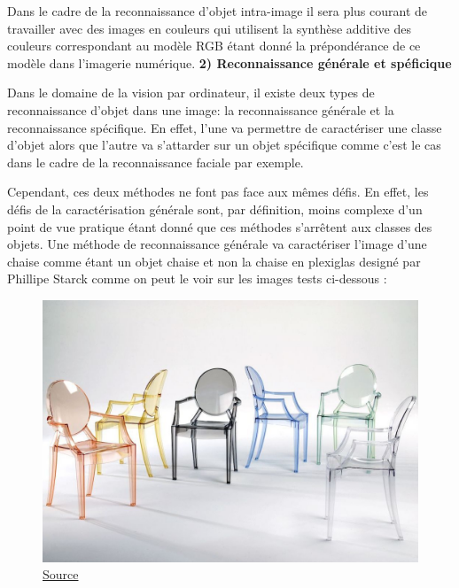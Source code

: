 \documentclass[a4paper,12pt]{article} %
\begin{document}
\par
Dans le cadre de la reconnaissance d’objet intra-image il sera plus courant de travailler avec des images en couleurs qui utilisent la synthèse additive des couleurs correspondant au modèle RGB étant donné la prépondérance de ce modèle dans l’imagerie numérique.\newline
\newpage
\textbf{2) Reconnaissance générale et spéficique}
\newline
\par
	Dans le domaine de la vision par ordinateur, il existe deux types de reconnaissance d'objet dans une image: la reconnaissance générale et la reconnaissance spécifique. En effet, l’une va permettre de caractériser une classe d’objet alors que l’autre va s’attarder sur un objet spécifique comme c’est le cas dans le cadre de la reconnaissance faciale par exemple. 
\newline
\par
Cependant, ces deux méthodes ne font pas face aux mêmes défis. En effet, les défis de la caractérisation générale sont, par définition, moins complexe d’un point de vue pratique étant donné que ces méthodes s’arrêtent aux classes des objets. Une méthode de reconnaissance générale va caractériser l’image d’une chaise comme étant un objet chaise et non la chaise en plexiglas designé par Phillipe Starck comme on peut le voir sur les images tests ci-dessous : 
\newline
\begin{figure}[h] %
  \centering %
  \includegraphics[scale=0.2]{stark.jpg} %
  \caption{\href{https://www.elle.fr/Deco/Reportages/Les-pros/Philippe-Starck-le-designer-star-en-dix-realisations-iconiques}{Source} }
\end{figure}
\end{document}
